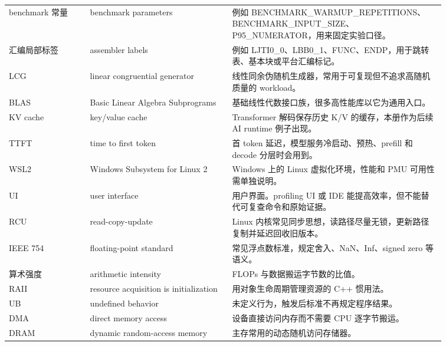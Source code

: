{\begin{longtable}{
  >{\raggedright\arraybackslash}p{0.16\linewidth}
  >{\raggedright\arraybackslash}p{0.28\linewidth}
  >{\raggedright\arraybackslash}p{0.42\linewidth}
}
benchmark 常量 & benchmark parameters & 例如 BENCHMARK\_WARMUP\_REPETITIONS、BENCHMARK\_INPUT\_SIZE、P95\_NUMERATOR，用来固定实验口径。 \\
汇编局部标签 & assembler labels & 例如 LJTI0\_0、LBB0\_1、FUNC、ENDP，用于跳转表、基本块或平台汇编标记。 \\
LCG & linear congruential generator & 线性同余伪随机生成器，常用于可复现但不追求高随机质量的 workload。 \\
BLAS & Basic Linear Algebra Subprograms & 基础线性代数接口族，很多高性能库以它为通用入口。 \\
KV cache & key/value cache & Transformer 解码保存历史 K/V 的缓存，本册作为后续 AI runtime 例子出现。 \\
TTFT & time to first token & 首 token 延迟，模型服务冷启动、预热、prefill 和 decode 分层时会用到。 \\
WSL2 & Windows Subsystem for Linux 2 & Windows 上的 Linux 虚拟化环境，性能和 PMU 可用性需单独说明。 \\
UI & user interface & 用户界面。profiling UI 或 IDE 能提高效率，但不能替代可复查命令和原始证据。 \\
RCU & read-copy-update & Linux 内核常见同步思想，读路径尽量无锁，更新路径复制并延迟回收旧版本。 \\
IEEE 754 & floating-point standard & 常见浮点数标准，规定舍入、NaN、Inf、signed zero 等语义。 \\
算术强度 & arithmetic intensity & FLOPs 与数据搬运字节数的比值。 \\
RAII & resource acquisition is initialization & 用对象生命周期管理资源的 C++ 惯用法。 \\
UB & undefined behavior & 未定义行为，触发后标准不再规定程序结果。 \\
DMA & direct memory access & 设备直接访问内存而不需要 CPU 逐字节搬运。 \\
DRAM & dynamic random-access memory & 主存常用的动态随机访问存储器。 \\
\bottomrule
\end{longtable}
}
